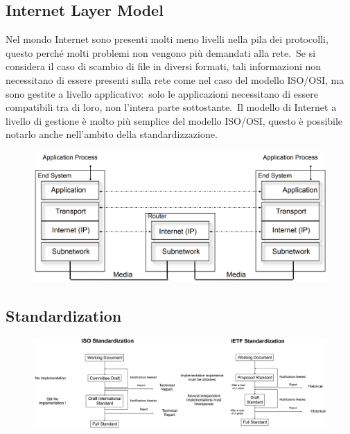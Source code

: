 \subsection{Internet Layer Model}

\noindent Nel mondo Internet sono presenti molti meno livelli nella pila dei protocolli, questo perché molti problemi non vengono più demandati alla rete.\
Se si considera il caso di scambio di file in diversi formati, tali informazioni non necessitano di essere presenti sulla rete come nel caso del modello ISO/OSI, ma sono gestite a livello applicativo:\ solo le applicazioni necessitano di essere compatibili tra di loro, non l'intera parte sottostante.\
Il modello di Internet a livello di gestione è molto più semplice del modello ISO/OSI, questo è possibile notarlo anche nell'ambito della standardizzazione.

\begin{figure}[H]
    \centering
    \includegraphics[width=\textwidth]{immagini/Internet_model.png}
\end{figure}

\subsection{Standardization}

\begin{figure}[H]
    \centering
    \includegraphics[width=\textwidth]{immagini/Standardization.png}
\end{figure}

